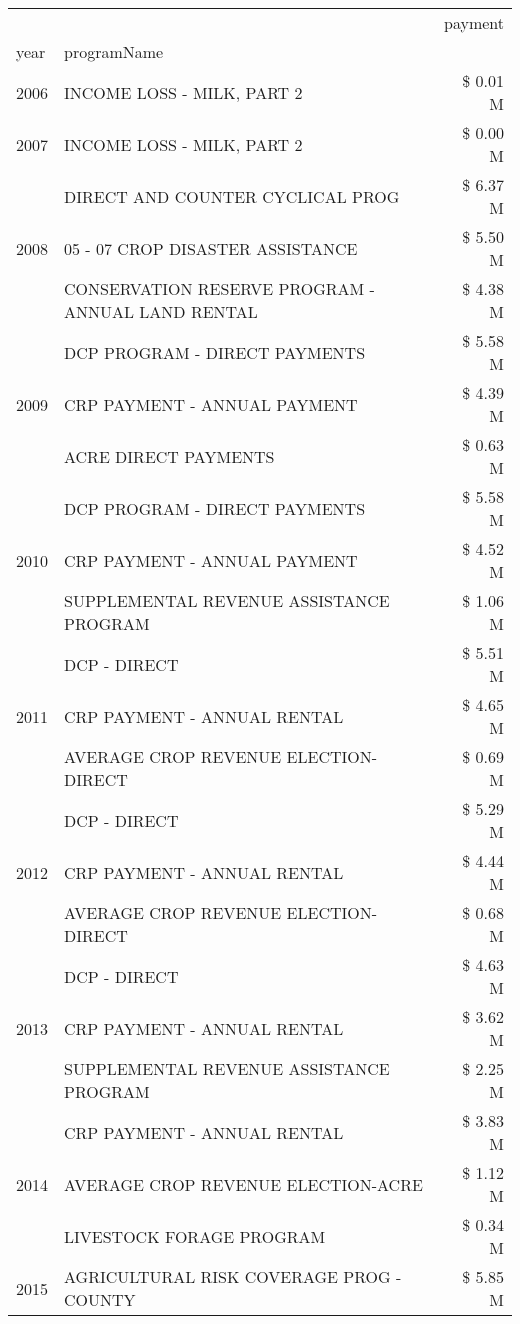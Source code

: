 \begin{tabular}{llr}
\toprule
 &  & payment \\
year & programName &  \\
\midrule
2006 & INCOME LOSS - MILK, PART 2 & \$ 0.01 M \\
\cline{1-3}
2007 & INCOME LOSS - MILK, PART 2 & \$ 0.00 M \\
\cline{1-3}
\multirow[t]{3}{*}{2008} & DIRECT AND COUNTER CYCLICAL PROG & \$ 6.37 M \\
 & 05 - 07 CROP DISASTER ASSISTANCE & \$ 5.50 M \\
 & CONSERVATION RESERVE PROGRAM - ANNUAL LAND RENTAL & \$ 4.38 M \\
\cline{1-3}
\multirow[t]{3}{*}{2009} & DCP PROGRAM - DIRECT PAYMENTS & \$ 5.58 M \\
 & CRP PAYMENT - ANNUAL PAYMENT & \$ 4.39 M \\
 & ACRE DIRECT PAYMENTS & \$ 0.63 M \\
\cline{1-3}
\multirow[t]{3}{*}{2010} & DCP PROGRAM - DIRECT PAYMENTS & \$ 5.58 M \\
 & CRP PAYMENT - ANNUAL PAYMENT & \$ 4.52 M \\
 & SUPPLEMENTAL REVENUE ASSISTANCE PROGRAM & \$ 1.06 M \\
\cline{1-3}
\multirow[t]{3}{*}{2011} & DCP - DIRECT & \$ 5.51 M \\
 & CRP PAYMENT - ANNUAL RENTAL & \$ 4.65 M \\
 & AVERAGE CROP REVENUE ELECTION-DIRECT & \$ 0.69 M \\
\cline{1-3}
\multirow[t]{3}{*}{2012} & DCP - DIRECT & \$ 5.29 M \\
 & CRP PAYMENT - ANNUAL RENTAL & \$ 4.44 M \\
 & AVERAGE CROP REVENUE ELECTION-DIRECT & \$ 0.68 M \\
\cline{1-3}
\multirow[t]{3}{*}{2013} & DCP - DIRECT & \$ 4.63 M \\
 & CRP PAYMENT - ANNUAL RENTAL & \$ 3.62 M \\
 & SUPPLEMENTAL REVENUE ASSISTANCE PROGRAM & \$ 2.25 M \\
\cline{1-3}
\multirow[t]{3}{*}{2014} & CRP PAYMENT - ANNUAL RENTAL & \$ 3.83 M \\
 & AVERAGE CROP REVENUE ELECTION-ACRE & \$ 1.12 M \\
 & LIVESTOCK FORAGE PROGRAM & \$ 0.34 M \\
\cline{1-3}
\multirow[t]{3}{*}{2015} & AGRICULTURAL RISK COVERAGE PROG - COUNTY & \$ 5.85 M \\

\end{tabular}
